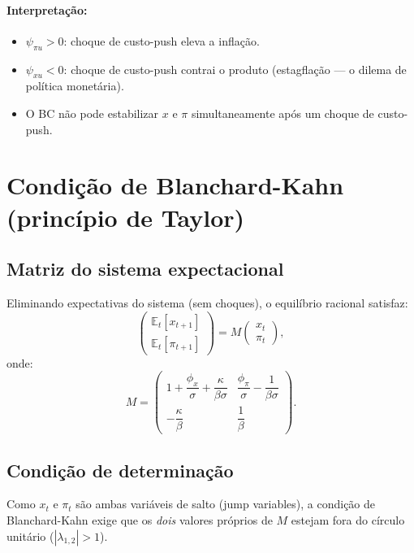 \documentclass[11pt,a4paper]{article}
\newcommand{\E}{\mathbb{E}}
\begin{document}
\paragraph{Interpretação:}
\begin{itemize}
  \item $\psi_{\pi u} > 0$: choque de custo-push eleva a inflação.
  \item $\psi_{xu} < 0$: choque de custo-push contrai o produto
    (estagflação --- o dilema de política monetária).
  \item O BC não pode estabilizar $x$ e $\pi$ simultaneamente
    após um choque de custo-push.
\end{itemize}

\section{Condição de Blanchard-Kahn (princípio de Taylor)}

\subsection{Matriz do sistema expectacional}

Eliminando expectativas do sistema (sem choques), o equilíbrio racional
satisfaz:
\[
  \begin{pmatrix}\E_t[x_{t+1}]\\\E_t[\pi_{t+1}]\end{pmatrix}
  = M\begin{pmatrix}x_t\\\pi_t\end{pmatrix},
\]
onde:
\begin{equation}\label{eq:system_matrix}
  M = \begin{pmatrix}
    1 + \dfrac{\phi_x}{\sigma} + \dfrac{\kappa}{\beta\sigma}
    & \dfrac{\phi_\pi}{\sigma} - \dfrac{1}{\beta\sigma} \\[8pt]
    -\dfrac{\kappa}{\beta}
    & \dfrac{1}{\beta}
  \end{pmatrix}.
\end{equation}

\subsection{Condição de determinação}

Como $x_t$ e $\pi_t$ são ambas variáveis de salto (jump variables),
a condição de Blanchard-Kahn exige que os \emph{dois} valores próprios
de $M$ estejam fora do círculo unitário ($|\lambda_{1,2}| > 1$).
\end{document}
